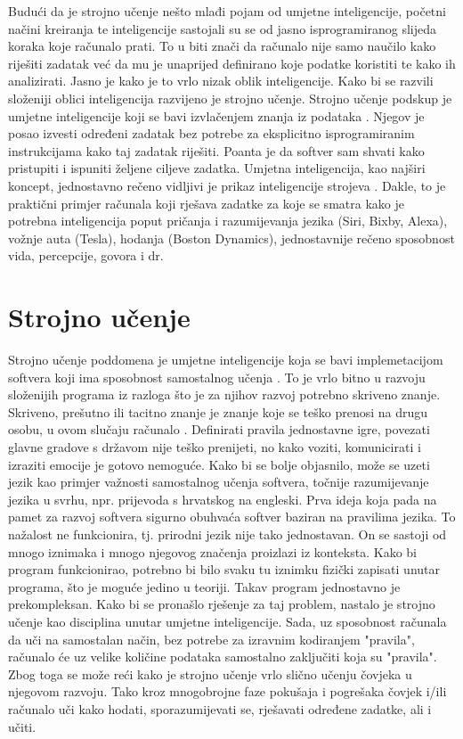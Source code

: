 \documentclass[]{foi} %
\begin{document}
Budući da je strojno učenje nešto mlađi pojam od umjetne inteligencije, početni načini kreiranja te inteligencije sastojali su se od jasno isprogramiranog slijeda koraka koje računalo prati. To u biti znači da računalo nije samo naučilo kako riješiti zadatak već da mu je unaprijed definirano koje podatke koristiti te kako ih analizirati. Jasno je kako je to vrlo nizak oblik inteligencije. Kako bi se razvili složeniji oblici inteligencija razvijeno je strojno učenje. Strojno učenje podskup je umjetne inteligencije koji se bavi izvlačenjem znanja iz podataka \cite{ml}. Njegov je posao izvesti određeni zadatak bez potrebe za eksplicitno isprogramiranim instrukcijama kako taj zadatak riješiti. Poanta je da softver sam shvati kako pristupiti i ispuniti željene ciljeve zadatka. Umjetna inteligencija, kao najširi koncept, jednostavno rečeno vidljivi je prikaz inteligencije strojeva \cite[str. 19]{AIModernApproach}. Dakle, to je praktični primjer računala koji rješava zadatke za koje se smatra kako je potrebna inteligencija poput pričanja i razumijevanja jezika (Siri, Bixby, Alexa), vožnje auta (Tesla), hodanja (Boston Dynamics), jednostavnije rečeno sposobnost vida, percepcije, govora i dr.

\section{Strojno učenje}
Strojno učenje poddomena je umjetne inteligencije koja se bavi implemetacijom softvera koji ima sposobnost samostalnog učenja \cite{ml}. To je vrlo bitno u razvoju složenijih programa iz razloga što je za njihov razvoj potrebno skriveno znanje. Skriveno, prešutno ili tacitno znanje je znanje koje se teško prenosi na drugu osobu, u ovom slučaju računalo \cite{tacitno}. Definirati pravila jednostavne igre, povezati glavne gradove s državom nije teško prenijeti, no kako voziti, komunicirati i izraziti emocije je gotovo nemoguće. Kako bi se bolje objasnilo, može se uzeti jezik kao primjer važnosti samostalnog učenja softvera, točnije razumijevanje jezika u svrhu, npr. prijevoda s hrvatskog na engleski. Prva ideja koja pada na pamet za razvoj softvera sigurno obuhvaća softver baziran na pravilima jezika. To nažalost ne funkcionira, tj. prirodni jezik nije tako jednostavan. On se sastoji od mnogo iznimaka i mnogo njegovog značenja proizlazi iz konteksta. Kako bi program funkcionirao, potrebno bi bilo svaku tu iznimku fizički zapisati unutar programa, što je moguće jedino u teoriji. Takav program jednostavno je prekompleksan. Kako bi se pronašlo rješenje za taj problem, nastalo je strojno učenje kao disciplina unutar umjetne inteligencije. Sada, uz sposobnost računala da uči na samostalan način, bez potrebe za izravnim kodiranjem "pravila", računalo će uz velike količine podataka samostalno zaključiti koja su "pravila". Zbog toga se može reći kako je strojno učenje vrlo slično učenju čovjeka u njegovom razvoju. Tako kroz mnogobrojne faze pokušaja i pogrešaka čovjek i/ili računalo uči kako hodati, sporazumijevati se, rješavati određene zadatke, ali i učiti.
\end{document}
